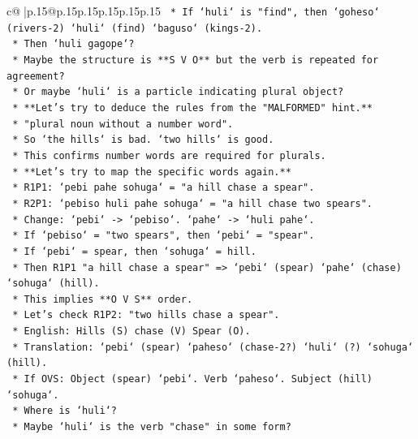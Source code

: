 \documentclass{article}
\begin{document}
{\begin{supertabular}{c@{$\;$}|p{.15\linewidth}@{}p{.15\linewidth}p{.15\linewidth}p{.15\linewidth}p{.15\linewidth}p{.15\linewidth}}
{{{\texttt{                            *   If `huli` is "find", then `goheso` (rivers{-}2) `huli` (find) `baguso` (kings{-}2).} \\
\texttt{                            *   Then `huli gagope`?} \\
\texttt{                            *   Maybe the structure is **S V O** but the verb is repeated for agreement?} \\
\texttt{                            *   Or maybe `huli` is a particle indicating plural object?} \\
\texttt{    *   **Let's try to deduce the rules from the "MALFORMED" hint.**} \\
\texttt{        *   "plural noun without a number word".} \\
\texttt{        *   So `the hills` is bad. `two hills` is good.} \\
\texttt{        *   This confirms number words are required for plurals.} \\
\texttt{    *   **Let's try to map the specific words again.**} \\
\texttt{        *   R1P1: `pebi pahe sohuga` = "a hill chase a spear".} \\
\texttt{        *   R2P1: `pebiso huli pahe sohuga` = "a hill chase two spears".} \\
\texttt{            *   Change: `pebi` {-}> `pebiso`. `pahe` {-}> `huli pahe`.} \\
\texttt{            *   If `pebiso` = "two spears", then `pebi` = "spear".} \\
\texttt{            *   If `pebi` = spear, then `sohuga` = hill.} \\
\texttt{            *   Then R1P1 "a hill chase a spear" => `pebi` (spear) `pahe` (chase) `sohuga` (hill).} \\
\texttt{            *   This implies **O V S** order.} \\
\texttt{            *   Let's check R1P2: "two hills chase a spear".} \\
\texttt{                *   English: Hills (S) chase (V) Spear (O).} \\
\texttt{                *   Translation: `pebi` (spear) `paheso` (chase{-}2?) `huli` (?) `sohuga` (hill).} \\
\texttt{                *   If OVS: Object (spear) `pebi`. Verb `paheso`. Subject (hill) `sohuga`.} \\
\texttt{                *   Where is `huli`?} \\
\texttt{                *   Maybe `huli` is the verb "chase" in some form?} \\
}}}
\end{supertabular}}
\end{document}
